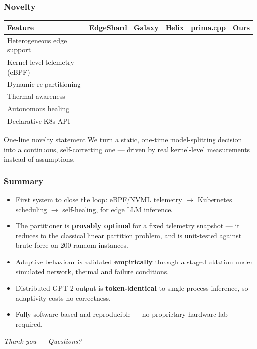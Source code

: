\documentclass[aspectratio=169,11pt]{beamer}
\newcommand{\yes}{\textcolor{kegreen}{\ding{51}}}
\newcommand{\no}{\textcolor{kered}{\ding{55}}}
\begin{document}
\begin{frame}
  \frametitle{Novelty}
  \vspace{0.4em}
  \centering
  {\small
  \renewcommand{\arraystretch}{1.4}
  \begin{tabular}{@{}lccccc@{}}
    \toprule
    \textbf{Feature} & \textbf{EdgeShard} & \textbf{Galaxy} & \textbf{Helix} &
      \textbf{prima.cpp} & \textbf{Ours}\\
    \midrule
    Heterogeneous edge support   & \yes & \yes & \no  & \yes & \yes\\
    Kernel-level telemetry (eBPF)& \no  & \no  & \no  & \no  & \yes\\
    Dynamic re-partitioning      & \no  & \no  & \no  & \no  & \yes\\
    Thermal awareness            & \no  & \no  & \no  & \no  & \yes\\
    Autonomous healing           & \no  & \no  & \yes & \no  & \yes\\
    Declarative K8s API          & \no  & \no  & \no  & \no  & \yes\\
    \bottomrule
  \end{tabular}}
  \vfill
  \begin{block}{One-line novelty statement}
    We turn a static, one-time model-splitting decision into a continuous,
    self-correcting one --- driven by real kernel-level measurements instead of
    assumptions.
  \end{block}
  \vspace{0.4em}
\end{frame}

\begin{frame}
  \frametitle{Summary}
  \begin{itemize}\itemsep0.4em\small
    \item First system to close the loop: eBPF/NVML telemetry $\rightarrow$
      Kubernetes scheduling $\rightarrow$ self-healing, for edge LLM inference.
    \item The partitioner is \textbf{provably optimal} for a fixed telemetry
      snapshot --- it reduces to the classical linear partition problem, and is
      unit-tested against brute force on 200 random instances.
    \item Adaptive behaviour is validated \textbf{empirically} through a staged
      ablation under simulated network, thermal and failure conditions.
    \item Distributed GPT-2 output is \textbf{token-identical} to single-process
      inference, so adaptivity costs no correctness.
    \item Fully software-based and reproducible --- no proprietary hardware lab
      required.
  \end{itemize}
  \vfill
  \begin{center}
    \Large\itshape Thank you --- Questions?
  \end{center}
  \vspace{0.2em}
\end{frame}
\end{document}
